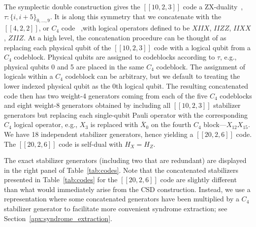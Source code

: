 The symplectic double construction gives the $[[10,2,3]]$ code a ZX-duality~\cite{Breuckmann_2024}, $\tau: \{i, i+5\}_{0,...,9}$. It is along this symmetry that we concatenate with the $[[4,2,2]]$, or $C_4$ code~\cite{Vaidman_1996, Grassl_1997} ,with logical operators defined to be $XIIX$, $IIZZ$, $IIXX$, $ZIIZ$. At a high level, the concatenation procedure can be thought of as replacing each physical qubit of the $[[10,2,3]]$ code with a logical qubit from a $C_4$ codeblock. Physical qubits are assigned to codeblocks according to $\tau$, e.g., physical qubits 0 and 5 are placed in the same $C_4$ codeblock. The assignment of logicals within a $C_4$ codeblock can be arbitrary, but we default to treating the lower indexed physical qubit as the 0th logical qubit. The resulting concatenated code then has two weight-4 generators coming from each of the five $C_4$ codeblocks and eight weight-8 generators obtained by including all $[[10,2,3]]$ stabilizer generators but replacing each single-qubit Pauli operator with the corresponding $C_4$ logical operator, e.g., $X_3$ is replaced with $\overline{X}_0$ on the fourth $C_4$ block---$X_{12}X_{15}$. We have 18 independent stabilizer generators, hence yielding a $[[20,2,6]]$ code. The $[[20,2,6]]$ code is self-dual with $H_X = H_Z$.

The exact stabilizer generators (including two that are redundant) are displayed in the right panel of Table~\ref{tab:codes}. Note that the concatenated stabilizers presented in Table~\ref{tab:codes} for the $[[20,2,6]]$ code are slightly different than what would immediately arise from the CSD construction. Instead, we use a representation where some concatenated generators have been multiplied by a $C_4$ stabilizer generator to facilitate more convenient syndrome extraction; see Section~\ref{apx:syndrome_extraction}.





